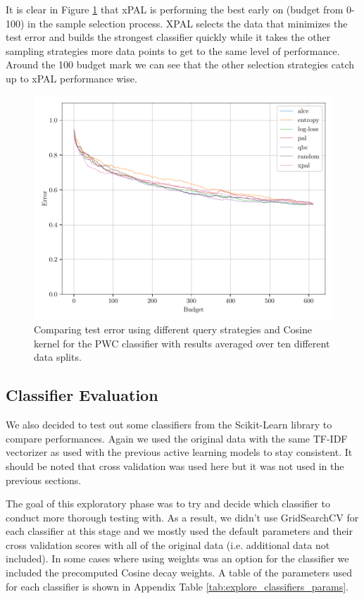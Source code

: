 It is clear in Figure \ref{fig:cos_avg_test_results} that xPAL is performing the best early on (budget from 0-100) in the sample selection process. XPAL selects the data that minimizes the test error and builds the strongest classifier quickly while it takes the other sampling strategies more data points to get to the same level of performance. Around the 100 budget mark we can see that the other selection strategies catch up to xPAL performance wise.

\begin{figure}[ht]
    \centering
    \includegraphics[width=\textwidth]{../img/plot_kernel_cos_averaged_test_results.pdf}
    \caption{Comparing test error using different query strategies and Cosine kernel for the PWC classifier with results averaged over ten different data splits.}
    \label{fig:cos_avg_test_results}
\end{figure}


\subsection{Classifier Evaluation}

We also decided to test out some classifiers from the Scikit-Learn library to compare performances. Again we used the original data with the same TF-IDF vectorizer as used with the previous active learning models to stay consistent. It should be noted that cross validation was used here but it was not used in the previous sections.

The goal of this exploratory phase was to try and decide which classifier to conduct more thorough testing with. As a result, we didn't use GridSearchCV for each classifier at this stage and we mostly used the default parameters and their cross validation scores with all of the original data (i.e. additional data not included). In some cases where using weights was an option for the classifier we included the precomputed Cosine decay weights. A table of the parameters used for each classifier is shown in Appendix Table \ref{tab:explore_classifiers_params}.

